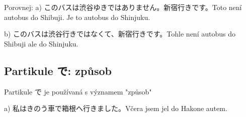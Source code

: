 Porovnej: 
a) このバスは渋谷ゆきではありません。新宿行きです。Toto není autobus do Shibuji. Je to autobus do Shinjuku.
 
b) このバスは渋谷行きではなくて、新宿行きです。Tohle není autobus do Shibuji ale do Shinjuku.


\subsection{Partikule で: způsob}

Partikule で je používaná s významem "způsob"　

a) 私はきのう車で箱根へ行きました。Včera jsem jel do Hakone autem.
